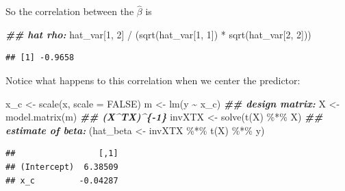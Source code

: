 \documentclass[
  12pt,
]{krantz}
\newenvironment{Shaded}{\begin{snugshade}}{\end{snugshade}}
\newcommand{\AttributeTok}[1]{\textcolor[rgb]{0.77,0.63,0.00}{#1}}
\newcommand{\ConstantTok}[1]{\textcolor[rgb]{0.00,0.00,0.00}{#1}}
\newcommand{\DecValTok}[1]{\textcolor[rgb]{0.00,0.00,0.81}{#1}}
\newcommand{\DocumentationTok}[1]{\textcolor[rgb]{0.56,0.35,0.01}{\textbf{\textit{#1}}}}
\newcommand{\FunctionTok}[1]{\textcolor[rgb]{0.00,0.00,0.00}{#1}}
\newcommand{\NormalTok}[1]{#1}
\newcommand{\OtherTok}[1]{\textcolor[rgb]{0.56,0.35,0.01}{#1}}
\newcommand{\SpecialCharTok}[1]{\textcolor[rgb]{0.00,0.00,0.00}{#1}}
\theoremstyle{definition}
\theoremstyle{definition}
\theoremstyle{definition}
\theoremstyle{definition}
\theoremstyle{remark}
\begin{document}
So the correlation between the \(\hat\beta\) is

\begin{Shaded}
\begin{Highlighting}[]
\DocumentationTok{\#\# hat rho:}
\NormalTok{hat\_var[}\DecValTok{1}\NormalTok{, }\DecValTok{2}\NormalTok{] }\SpecialCharTok{/}\NormalTok{ (}\FunctionTok{sqrt}\NormalTok{(hat\_var[}\DecValTok{1}\NormalTok{, }\DecValTok{1}\NormalTok{]) }\SpecialCharTok{*} \FunctionTok{sqrt}\NormalTok{(hat\_var[}\DecValTok{2}\NormalTok{, }\DecValTok{2}\NormalTok{]))}
\end{Highlighting}
\end{Shaded}

\begin{verbatim}
## [1] -0.9658
\end{verbatim}

Notice what happens to this correlation when we center the predictor:

\begin{Shaded}
\begin{Highlighting}[]
\NormalTok{x\_c }\OtherTok{\textless{}{-}} \FunctionTok{scale}\NormalTok{(x, }\AttributeTok{scale =} \ConstantTok{FALSE}\NormalTok{)}
\NormalTok{m }\OtherTok{\textless{}{-}} \FunctionTok{lm}\NormalTok{(y }\SpecialCharTok{\textasciitilde{}}\NormalTok{ x\_c)}
\DocumentationTok{\#\# design matrix:}
\NormalTok{X }\OtherTok{\textless{}{-}} \FunctionTok{model.matrix}\NormalTok{(m)}
\DocumentationTok{\#\# (X\^{}TX)\^{}\{{-}1\}}
\NormalTok{invXTX }\OtherTok{\textless{}{-}} \FunctionTok{solve}\NormalTok{(}\FunctionTok{t}\NormalTok{(X) }\SpecialCharTok{\%*\%}\NormalTok{ X)}
\DocumentationTok{\#\# estimate of beta:}
\NormalTok{(hat\_beta }\OtherTok{\textless{}{-}}\NormalTok{ invXTX }\SpecialCharTok{\%*\%} \FunctionTok{t}\NormalTok{(X) }\SpecialCharTok{\%*\%}\NormalTok{ y)}
\end{Highlighting}
\end{Shaded}

\begin{verbatim}
##                 [,1]
## (Intercept)  6.38509
## x_c         -0.04287
\end{verbatim}

\begin{Shaded}
\end{Shaded}
\end{document}
